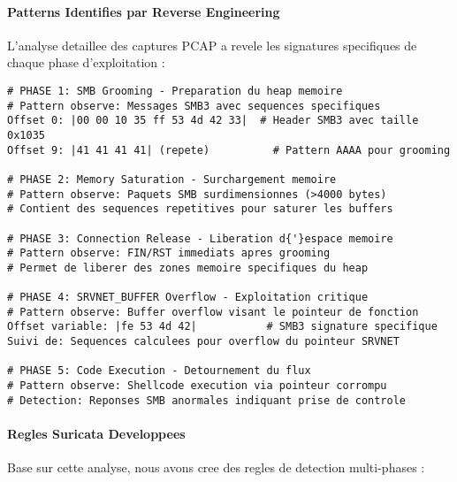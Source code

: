 \paragraph{Patterns Identifies par Reverse Engineering}

L{'}analyse detaillee des captures PCAP a revele les signatures specifiques de chaque phase d{'}exploitation :

\begin{lstlisting}[style=bashstyle,caption=Patterns critiques identifies dans l'attaque EternalBlue]
# PHASE 1: SMB Grooming - Preparation du heap memoire
# Pattern observe: Messages SMB3 avec sequences specifiques
Offset 0: |00 00 10 35 ff 53 4d 42 33|  # Header SMB3 avec taille 0x1035
Offset 9: |41 41 41 41| (repete)          # Pattern AAAA pour grooming

# PHASE 2: Memory Saturation - Surchargement memoire
# Pattern observe: Paquets SMB surdimensionnes (>4000 bytes)
# Contient des sequences repetitives pour saturer les buffers

# PHASE 3: Connection Release - Liberation d{'}espace memoire
# Pattern observe: FIN/RST immediats apres grooming
# Permet de liberer des zones memoire specifiques du heap

# PHASE 4: SRVNET_BUFFER Overflow - Exploitation critique
# Pattern observe: Buffer overflow visant le pointeur de fonction
Offset variable: |fe 53 4d 42|           # SMB3 signature specifique
Suivi de: Sequences calculees pour overflow du pointeur SRVNET

# PHASE 5: Code Execution - Detournement du flux
# Pattern observe: Shellcode execution via pointeur corrompu
# Detection: Reponses SMB anormales indiquant prise de controle
\end{lstlisting}

\paragraph{Regles Suricata Developpees}

Base sur cette analyse, nous avons cree des regles de detection multi-phases :

